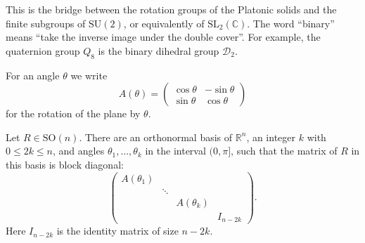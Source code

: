 \begin{remark}
\label{remark-quaternions-binary-groups}
This is the bridge between the rotation
groups of the Platonic solids and the finite
subgroups of $\text{SU}(2)$, or equivalently
of $\text{SL}_2(\mathbb{C})$. The word
``binary'' means ``take the inverse image
under the double cover''. For example, the
quaternion group $Q_8$ is the binary
dihedral group $\mathcal{D}_2$.
\end{remark}

\noindent
For an angle $\theta$ we write
$$
A(\theta)=
\begin{pmatrix}
\cos\theta & -\sin\theta \\
\sin\theta & \cos\theta
\end{pmatrix}
$$
for the rotation of the plane by $\theta$.

\begin{proposition}
\label{proposition-normal-form-son}
Let $R \in \text{SO}(n)$. There are an
orthonormal basis of $\mathbb{R}^n$, an
integer $k$ with $0 \leq 2k \leq n$, and
angles $\theta_1,\ldots,\theta_k$ in the
interval $(0,\pi]$, such that the matrix of
$R$ in this basis is block diagonal:
$$
\begin{pmatrix}
A(\theta_1) & & & \\
& \ddots & & \\
& & A(\theta_k) & \\
& & & I_{n-2k}
\end{pmatrix}.
$$
Here $I_{n-2k}$ is the identity matrix of
size $n-2k$.
\end{proposition}

